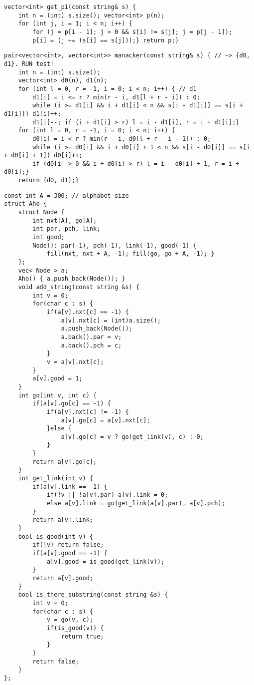 \documentclass[12pt]{article}
\begin{document}
\begin{verbatim}
vector<int> get_pi(const string& s) {
    int n = (int) s.size(); vector<int> p(n);
    for (int j, i = 1; i < n; i++) {
        for (j = p[i - 1]; j > 0 && s[i] != s[j]; j = p[j - 1]);
        p[i] = (j += (s[i] == s[j]));} return p;}
\end{verbatim}

\begin{verbatim}
pair<vector<int>, vector<int>> manacker(const string& s) { // -> {d0, d1}. RUN test!
    int n = (int) s.size();
    vector<int> d0(n), d1(n);
    for (int l = 0, r = -1, i = 0; i < n; i++) { // d1
        d1[i] = i <= r ? min(r - i, d1[l + r - i]) : 0;
        while (i >= d1[i] && i + d1[i] < n && s[i - d1[i]] == s[i + d1[i]]) d1[i]++;
        d1[i]--; if (i + d1[i] > r) l = i - d1[i], r = i + d1[i];}
    for (int l = 0, r = -1, i = 0; i < n; i++) {
        d0[i] = i < r ? min(r - i, d0[l + r - i - 1]) : 0;
        while (i >= d0[i] && i + d0[i] + 1 < n && s[i - d0[i]] == s[i + d0[i] + 1]) d0[i]++;
        if (d0[i] > 0 && i + d0[i] > r) l = i - d0[i] + 1, r = i + d0[i];}
    return {d0, d1};}
\end{verbatim}

\begin{verbatim}
const int A = 300; // alphabet size
struct Aho {
    struct Node {
        int nxt[A], go[A];
        int par, pch, link;
        int good;
        Node(): par(-1), pch(-1), link(-1), good(-1) {
            fill(nxt, nxt + A, -1); fill(go, go + A, -1); }
    };
    vec< Node > a;
    Aho() { a.push_back(Node()); }
    void add_string(const string &s) {
        int v = 0;
        for(char c : s) {
            if(a[v].nxt[c] == -1) {
                a[v].nxt[c] = (int)a.size();
                a.push_back(Node());
                a.back().par = v;
                a.back().pch = c;
            }
            v = a[v].nxt[c];
        }
        a[v].good = 1;
    }
    int go(int v, int c) {
        if(a[v].go[c] == -1) {
            if(a[v].nxt[c] != -1) {
                a[v].go[c] = a[v].nxt[c];
            }else {
                a[v].go[c] = v ? go(get_link(v), c) : 0;
            }
        }
        return a[v].go[c];
    }
    int get_link(int v) {
        if(a[v].link == -1) {
            if(!v || !a[v].par) a[v].link = 0;
            else a[v].link = go(get_link(a[v].par), a[v].pch);
        }
        return a[v].link;
    }
    bool is_good(int v) {
        if(!v) return false;
        if(a[v].good == -1) {
            a[v].good = is_good(get_link(v));
        }
        return a[v].good;
    }
    bool is_there_substring(const string &s) {
        int v = 0;
        for(char c : s) {
            v = go(v, c);
            if(is_good(v)) {
                return true;
            }
        }
        return false;
    }
};
\end{verbatim}
\end{document}
